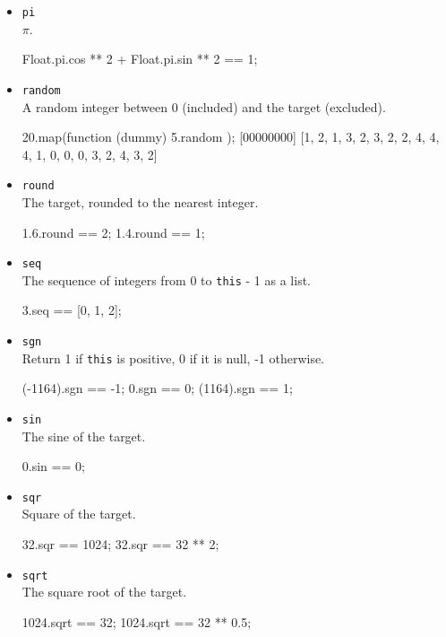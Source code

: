 \begin{itemize}
\item \lstinline|pi|\\
  $\pi$.
\begin{urbiassert}[firstnumber=last]
Float.pi.cos ** 2 + Float.pi.sin ** 2 == 1;
\end{urbiassert}

\item \lstinline|random|\\
  A random integer between 0 (included) and the target (excluded).
\begin{urbiscript}[firstnumber=last]
20.map(function (dummy) { 5.random });
[00000000] [1, 2, 1, 3, 2, 3, 2, 2, 4, 4, 4, 1, 0, 0, 0, 3, 2, 4, 3, 2]
\end{urbiscript}

\item \lstinline|round|\\
  The target, rounded to the nearest integer.
\begin{urbiassert}[firstnumber=last]
1.6.round == 2;
1.4.round == 1;
\end{urbiassert}

\item \lstinline|seq|\\
  The sequence of integers from 0 to \lstinline|this| - 1 as a list.
\begin{urbiassert}[firstnumber=last]
3.seq == [0, 1, 2];
\end{urbiassert}

\item \lstinline|sgn|\\
  Return 1 if \lstinline|this| is positive, 0 if it is null, -1
  otherwise.
\begin{urbiassert}[firstnumber=last]
(-1164).sgn == -1;
0.sgn       == 0;
(1164).sgn  == 1;
\end{urbiassert}

\item \lstinline|sin|\\
  The sine of the target.
\begin{urbiassert}[firstnumber=last]
0.sin == 0;
\end{urbiassert}

\item \lstinline|sqr|\\
  Square of the target.
\begin{urbiassert}[firstnumber=last]
32.sqr == 1024;
32.sqr == 32 ** 2;
\end{urbiassert}

\item \lstinline|sqrt|\\
  The square root of the target.
\begin{urbiassert}[firstnumber=last]
1024.sqrt == 32;
1024.sqrt == 32 ** 0.5;
\end{urbiassert}


\end{itemize}
